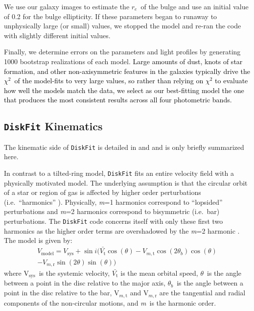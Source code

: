 \documentclass[a4paper,fleqn,usenatbib]{mnras}
\newcommand{\authorfix}{\textcolor{black}}
\begin{document}
We use our galaxy images to estimate the $r_{e}$\ of the bulge and use an initial value of 0.2 for the bulge ellipticity. If these parameters began to runaway to unphysically large (or small) values, we stopped the model and re-ran the code with slightly different initial values.

Finally, we determine errors on the parameters and light profiles by generating 1000 bootstrap realizations of each model. \authorfix{Large amounts of dust, knots of star formation, and other non-axisymmetric features in the galaxies typically drive the $\chi^{2}$\ of the model-fits to very large values, so rather than relying on $\chi^{2}$ to evaluate how well the models match the data, we select as our best-fitting model the one that produces the most consistent results across all four photometric bands.}

\subsection{\texttt{DiskFit} Kinematics}
\label{sec:dfkine}

The kinematic side of \texttt{DiskFit} is detailed in \citet{spekkens2007} and \citet{sellwood2010} and is only briefly summarized here. 

In contrast to a tilted-ring model, \texttt{DiskFit} fits an entire velocity field with a physically motivated model. The underlying assumption is that the circular orbit of a star or region of gas is affected by higher order perturbations (i.e.\ ``harmonics'' ). Physically, \textit{m}=1 harmonics correspond to ``lopsided'' perturbations and \textit{m}=2 harmonics correspond to bisymmetric (i.e.\ bar) perturbations. The \texttt{DiskFit} code concerns itself with only these first two harmonics as the higher order terms are overshadowed by the \textit{m}=2 harmonic \citep{spekkens2007}. The model is given by:
\begin{multline}
V_{\mathrm{model}} = V_{\mathrm{sys}} + \sin{i} ( \bar{V_{\mathrm{t}}}\cos{(\theta)} - V_{m,\mathrm{t}}\cos{(2\theta_{b})}\cos{(\theta)} \\ 
- V_{m,\mathrm{r}}\sin{(2\theta)}\sin{(\theta)} )
\end{multline}
where V$_{\mathrm{sys}}$\ is the systemic velocity, $\bar{V_{\mathrm{t}}}$ is the mean orbital speed, $\theta$\ is the angle between a point in the disc relative to the major axis, $\theta_{b}$\ is the angle between a point in the disc relative to the bar, V$_{m,\mathrm{t}}$ and V$_{m, \mathrm{r}}$ are the tangential and radial components of the non-circular motions, and \textit{m}\ is the harmonic order. 
\end{document}
